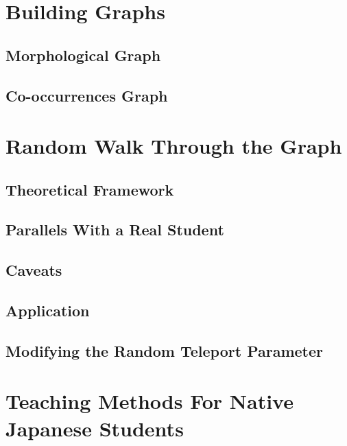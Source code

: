 \section{Building Graphs}
\subsection{Morphological Graph}
\subsection{Co-occurrences Graph}
\section{Random Walk Through the Graph}
\subsection{Theoretical Framework}
\subsection{Parallels With a Real Student}
\subsection{Caveats}
\subsection{Application}
\subsection{Modifying the Random Teleport Parameter}
\section{Teaching Methods For Native Japanese Students}